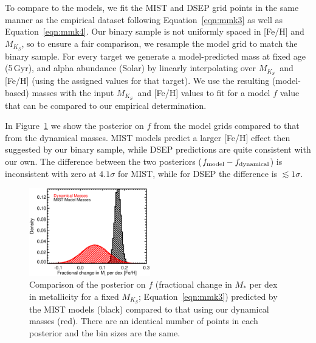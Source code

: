 \documentclass[twocolumn]{aastex62}
\newcommand{\mks}{$M_{K_S}$}
\begin{document}
To compare to the models, we fit the MIST and DSEP grid points in the same manner as the empirical dataset following Equation~\ref{eqn:mmk3} as well as Equation~\ref{eqn:mmk4}. Our binary sample is not uniformly spaced in [Fe/H] and \mks, so to ensure a fair comparison, we resample the model grid to match the binary sample. For every target we generate a model-predicted mass at fixed age (5\,Gyr), and alpha abundance (Solar) by linearly interpolating over \mks\ and [Fe/H] (using the assigned values for that target). We use the resulting (model-based) masses with the input \mks\ and [Fe/H] values to fit for a model $f$ value that can be compared to our empirical determination.

In Figure~\ref{fig:f} we show the posterior on $f$ from the model grids compared to that from the dynamical masses. MIST models predict a larger [Fe/H] effect then suggested by our binary sample, while DSEP predictions are quite consistent with our own. The difference between the two posteriors ($f_{\rm{model}}-f_{\rm{dynamical}}$) is inconsistent with zero at $4.1\sigma$ for MIST, while for DSEP the difference is $\lesssim1\sigma$. 

\begin{figure}[htp]
\begin{center}
\includegraphics[width=0.47\textwidth]{F_plot.eps}
\caption{Comparison of the posterior on $f$ (fractional change in $M_*$ per dex in metallicity for a fixed \mks; Equation~\ref{eqn:mmk3}) predicted by the MIST models (black) compared to that using our dynamical masses (red). There are an identical number of points in each posterior and the bin sizes are the same. }
\label{fig:f}
\end{center}
\end{figure}

\end{document}
